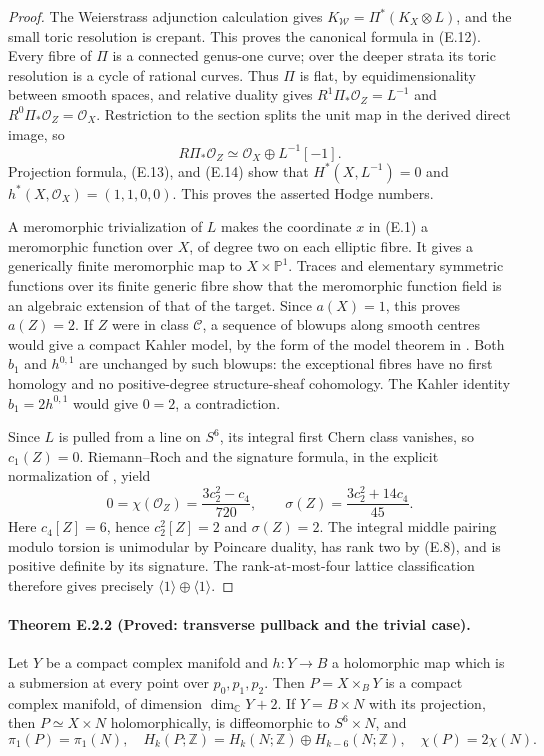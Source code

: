 \begin{proof}
The Weierstrass adjunction calculation gives
$K_{\mathscr W}=\Pi^*(K_X\otimes L)$, and the small toric
resolution is crepant.  This proves the canonical formula in
(E.12).  Every fibre of $\Pi$ is a connected genus-one curve;
over the deeper strata its toric resolution is a cycle of rational
curves.  Thus $\Pi$ is flat, by equidimensionality between smooth
spaces, and relative duality gives
$R^1\Pi_*\mathcal O_Z=L^{-1}$ and
$R^0\Pi_*\mathcal O_Z=\mathcal O_X$.
Restriction to the section splits the unit map in the derived
direct image, so
\[
 R\Pi_*\mathcal O_Z\simeq
 \mathcal O_X\oplus L^{-1}[-1].
\]
Projection formula, (E.13), and (E.14) show that
$H^*(X,L^{-1})=0$ and $h^*(X,\mathcal O_X)=(1,1,0,0)$.
This proves the asserted Hodge numbers.

A meromorphic trivialization of $L$ makes the coordinate $x$ in
(E.1) a meromorphic function over $X$, of degree two on each
elliptic fibre.  It gives a generically finite meromorphic map to
$X\times\mathbb P^1$.  Traces and elementary symmetric functions
over its finite generic fibre show that the meromorphic function
field is an algebraic extension of that of the target.  Since
$a(X)=1$, this proves $a(Z)=2$.  If $Z$ were in class
$\mathcal C$, a sequence of blowups along smooth centres would
give a compact Kahler model, by the form of the model theorem
in \cite[Theorem 1.1 and Remark 1.2]{ffJiaMeng}.
Both $b_1$ and $h^{0,1}$ are unchanged by such blowups: the
exceptional fibres have no first homology and no positive-degree
structure-sheaf cohomology.  The Kahler identity
$b_1=2h^{0,1}$ would give $0=2$, a contradiction.

Since $L$ is pulled from a line on $S^6$, its integral first Chern
class vanishes, so $c_1(Z)=0$.  Riemann--Roch and the signature
formula, in the explicit normalization of
\cite[(1.2)--(1.4)]{ffEsoleKang}, yield
\[
 0=\chi(\mathcal O_Z)=\frac{3c_2^2-c_4}{720},\qquad
 \sigma(Z)=\frac{3c_2^2+14c_4}{45}.
\]
Here $c_4[Z]=6$, hence $c_2^2[Z]=2$ and $\sigma(Z)=2$.
The integral middle pairing modulo torsion is unimodular by
Poincare duality, has rank two by (E.8), and is positive definite
by its signature.  The rank-at-most-four lattice classification
\cite[Theorem 2.2.1]{ffPetersSterk} therefore gives precisely
$\langle1\rangle\oplus\langle1\rangle$.
\end{proof}

\paragraph{Theorem E.2.2 (Proved: transverse pullback and the trivial case).}
Let $Y$ be a compact complex manifold and $h:Y\to B$ a holomorphic
map which is a submersion at every point over $p_0,p_1,p_2$.
Then $P=X\times_B Y$ is a compact complex manifold, of dimension
$\dim_{\mathbb C}Y+2$.  If $Y=B\times N$ with its projection,
then $P\simeq X\times N$ holomorphically, is diffeomorphic to
$S^6\times N$, and
\[
 \pi_1(P)=\pi_1(N),\quad
 H_k(P;\mathbb Z)=H_k(N;\mathbb Z)\oplus H_{k-6}(N;\mathbb Z),
 \quad \chi(P)=2\chi(N).
 \tag{E.15}
\]


